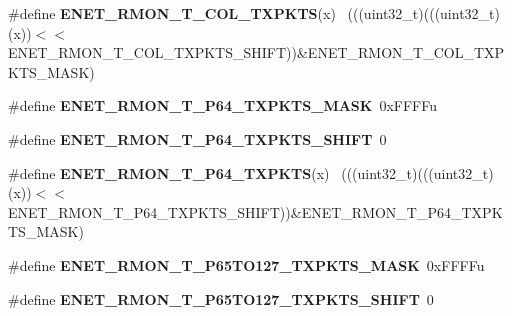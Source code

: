 \begin{DoxyCompactItemize}
\item 
\hypertarget{group___e_n_e_t___register___masks_gadf843f07861ed3f729730a27b7dab35d}{}\#define {\bfseries E\+N\+E\+T\+\_\+\+R\+M\+O\+N\+\_\+\+T\+\_\+\+C\+O\+L\+\_\+\+T\+X\+P\+K\+T\+S}(x)                            ~(((uint32\+\_\+t)(((uint32\+\_\+t)(x))$<$$<$E\+N\+E\+T\+\_\+\+R\+M\+O\+N\+\_\+\+T\+\_\+\+C\+O\+L\+\_\+\+T\+X\+P\+K\+T\+S\+\_\+\+S\+H\+I\+F\+T))\&E\+N\+E\+T\+\_\+\+R\+M\+O\+N\+\_\+\+T\+\_\+\+C\+O\+L\+\_\+\+T\+X\+P\+K\+T\+S\+\_\+\+M\+A\+S\+K)\label{group___e_n_e_t___register___masks_gadf843f07861ed3f729730a27b7dab35d}

\item 
\hypertarget{group___e_n_e_t___register___masks_ga1db32099fbc7f82b96894eceb27fadc7}{}\#define {\bfseries E\+N\+E\+T\+\_\+\+R\+M\+O\+N\+\_\+\+T\+\_\+\+P64\+\_\+\+T\+X\+P\+K\+T\+S\+\_\+\+M\+A\+S\+K}~0x\+F\+F\+F\+Fu\label{group___e_n_e_t___register___masks_ga1db32099fbc7f82b96894eceb27fadc7}

\item 
\hypertarget{group___e_n_e_t___register___masks_gac06c1d984f1ef4f7fe433830c0c45398}{}\#define {\bfseries E\+N\+E\+T\+\_\+\+R\+M\+O\+N\+\_\+\+T\+\_\+\+P64\+\_\+\+T\+X\+P\+K\+T\+S\+\_\+\+S\+H\+I\+F\+T}~0\label{group___e_n_e_t___register___masks_gac06c1d984f1ef4f7fe433830c0c45398}

\item 
\hypertarget{group___e_n_e_t___register___masks_gaa7c3cf857de7000d16946010d8d5c484}{}\#define {\bfseries E\+N\+E\+T\+\_\+\+R\+M\+O\+N\+\_\+\+T\+\_\+\+P64\+\_\+\+T\+X\+P\+K\+T\+S}(x)                            ~(((uint32\+\_\+t)(((uint32\+\_\+t)(x))$<$$<$E\+N\+E\+T\+\_\+\+R\+M\+O\+N\+\_\+\+T\+\_\+\+P64\+\_\+\+T\+X\+P\+K\+T\+S\+\_\+\+S\+H\+I\+F\+T))\&E\+N\+E\+T\+\_\+\+R\+M\+O\+N\+\_\+\+T\+\_\+\+P64\+\_\+\+T\+X\+P\+K\+T\+S\+\_\+\+M\+A\+S\+K)\label{group___e_n_e_t___register___masks_gaa7c3cf857de7000d16946010d8d5c484}

\item 
\hypertarget{group___e_n_e_t___register___masks_gaebb8723106917311976e5e457d535e81}{}\#define {\bfseries E\+N\+E\+T\+\_\+\+R\+M\+O\+N\+\_\+\+T\+\_\+\+P65\+T\+O127\+\_\+\+T\+X\+P\+K\+T\+S\+\_\+\+M\+A\+S\+K}~0x\+F\+F\+F\+Fu\label{group___e_n_e_t___register___masks_gaebb8723106917311976e5e457d535e81}

\item 
\hypertarget{group___e_n_e_t___register___masks_ga76051106460eb4da2d6c1349785902bf}{}\#define {\bfseries E\+N\+E\+T\+\_\+\+R\+M\+O\+N\+\_\+\+T\+\_\+\+P65\+T\+O127\+\_\+\+T\+X\+P\+K\+T\+S\+\_\+\+S\+H\+I\+F\+T}~0\label{group___e_n_e_t___register___masks_ga76051106460eb4da2d6c1349785902bf}


\end{DoxyCompactItemize}
